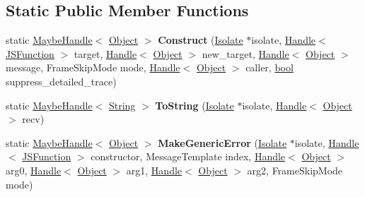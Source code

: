 \subsection*{Static Public Member Functions}
\begin{DoxyCompactItemize}
\item 
\mbox{\label{classv8_1_1internal_1_1ErrorUtils_a8b78ee7d37754fa60a6934fac174e14c}} 
static \mbox{\hyperlink{classv8_1_1internal_1_1MaybeHandle}{Maybe\+Handle}}$<$ \mbox{\hyperlink{classv8_1_1internal_1_1Object}{Object}} $>$ {\bfseries Construct} (\mbox{\hyperlink{classv8_1_1internal_1_1Isolate}{Isolate}} $\ast$isolate, \mbox{\hyperlink{classv8_1_1internal_1_1Handle}{Handle}}$<$ \mbox{\hyperlink{classv8_1_1internal_1_1JSFunction}{J\+S\+Function}} $>$ target, \mbox{\hyperlink{classv8_1_1internal_1_1Handle}{Handle}}$<$ \mbox{\hyperlink{classv8_1_1internal_1_1Object}{Object}} $>$ new\+\_\+target, \mbox{\hyperlink{classv8_1_1internal_1_1Handle}{Handle}}$<$ \mbox{\hyperlink{classv8_1_1internal_1_1Object}{Object}} $>$ message, Frame\+Skip\+Mode mode, \mbox{\hyperlink{classv8_1_1internal_1_1Handle}{Handle}}$<$ \mbox{\hyperlink{classv8_1_1internal_1_1Object}{Object}} $>$ caller, \mbox{\hyperlink{classbool}{bool}} suppress\+\_\+detailed\+\_\+trace)
\item 
\mbox{\label{classv8_1_1internal_1_1ErrorUtils_a9991b712efe2b9d8fb444e83c822c68e}} 
static \mbox{\hyperlink{classv8_1_1internal_1_1MaybeHandle}{Maybe\+Handle}}$<$ \mbox{\hyperlink{classv8_1_1internal_1_1String}{String}} $>$ {\bfseries To\+String} (\mbox{\hyperlink{classv8_1_1internal_1_1Isolate}{Isolate}} $\ast$isolate, \mbox{\hyperlink{classv8_1_1internal_1_1Handle}{Handle}}$<$ \mbox{\hyperlink{classv8_1_1internal_1_1Object}{Object}} $>$ recv)
\item 
\mbox{\label{classv8_1_1internal_1_1ErrorUtils_a8d0c763d6fc5974eb3043bd5986993e8}} 
static \mbox{\hyperlink{classv8_1_1internal_1_1MaybeHandle}{Maybe\+Handle}}$<$ \mbox{\hyperlink{classv8_1_1internal_1_1Object}{Object}} $>$ {\bfseries Make\+Generic\+Error} (\mbox{\hyperlink{classv8_1_1internal_1_1Isolate}{Isolate}} $\ast$isolate, \mbox{\hyperlink{classv8_1_1internal_1_1Handle}{Handle}}$<$ \mbox{\hyperlink{classv8_1_1internal_1_1JSFunction}{J\+S\+Function}} $>$ constructor, Message\+Template index, \mbox{\hyperlink{classv8_1_1internal_1_1Handle}{Handle}}$<$ \mbox{\hyperlink{classv8_1_1internal_1_1Object}{Object}} $>$ arg0, \mbox{\hyperlink{classv8_1_1internal_1_1Handle}{Handle}}$<$ \mbox{\hyperlink{classv8_1_1internal_1_1Object}{Object}} $>$ arg1, \mbox{\hyperlink{classv8_1_1internal_1_1Handle}{Handle}}$<$ \mbox{\hyperlink{classv8_1_1internal_1_1Object}{Object}} $>$ arg2, Frame\+Skip\+Mode mode)

\end{DoxyCompactItemize}
